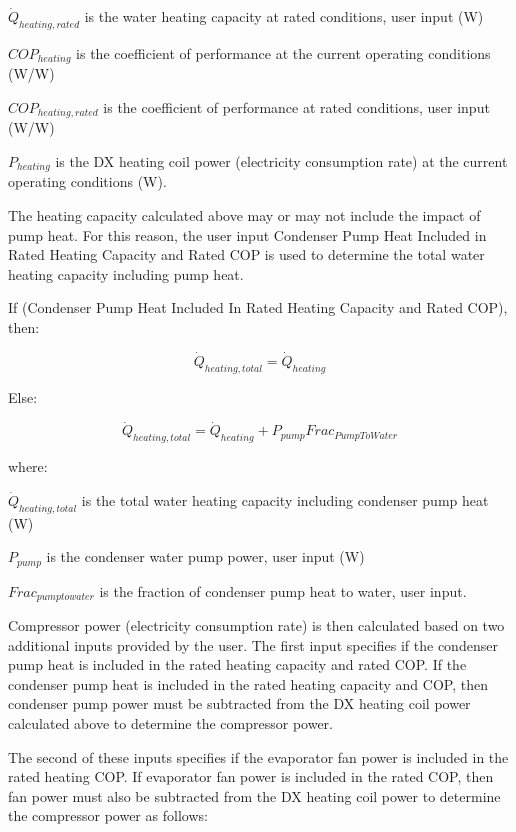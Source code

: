 \({\dot{Q}_{heating,rated}}\) is the water heating capacity at rated conditions, user input (W)

\(CO{P_{heating}}\) is the coefficient of performance at the current operating conditions (W/W)

\(CO{P_{heating,rated}}\) is the coefficient of performance at rated conditions, user input (W/W)

\({P_{heating}}\) is the DX heating coil power (electricity consumption rate) at the current operating conditions (W).

The heating capacity calculated above may or may not include the impact of pump heat. For this reason, the user input Condenser Pump Heat Included in Rated Heating Capacity and Rated COP is used to determine the total water heating capacity including pump heat.

If (Condenser Pump Heat Included In Rated Heating Capacity and Rated COP), then:

\begin{equation}
  \dot{Q}_{heating,total} = \dot{Q}_{heating}
\end{equation}

Else:

\begin{equation}
  \dot{Q}_{heating,total} = \dot{Q}_{heating} + P_{pump}Frac_{PumpToWater}
\end{equation}

where:

\({\dot{Q}_{heating,total}}\) is the total water heating capacity including condenser pump heat (W)

\({P_{pump}}\) is the condenser water pump power, user input (W)

\(Fra{c_{pumptowater}}\) is the fraction of condenser pump heat to water, user input.

Compressor power (electricity consumption rate) is then calculated based on two additional inputs provided by the user. The first input specifies if the condenser pump heat is included in the rated heating capacity and rated COP. If the condenser pump heat is included in the rated heating capacity and COP, then condenser pump power must be subtracted from the DX heating coil power calculated above to determine the compressor power.

The second of these inputs specifies if the evaporator fan power is included in the rated heating COP. If evaporator fan power is included in the rated COP, then fan power must also be subtracted from the DX heating coil power to determine the compressor power as follows:

